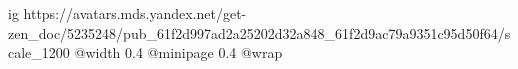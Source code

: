  
 
 
 
 

\ifcmt
  ig https://avatars.mds.yandex.net/get-zen_doc/5235248/pub_61f2d997ad2a25202d32a848_61f2d9ac79a9351c95d50f64/scale_1200
  @width 0.4
  @minipage 0.4
  @wrap \parpic[r]
\fi
